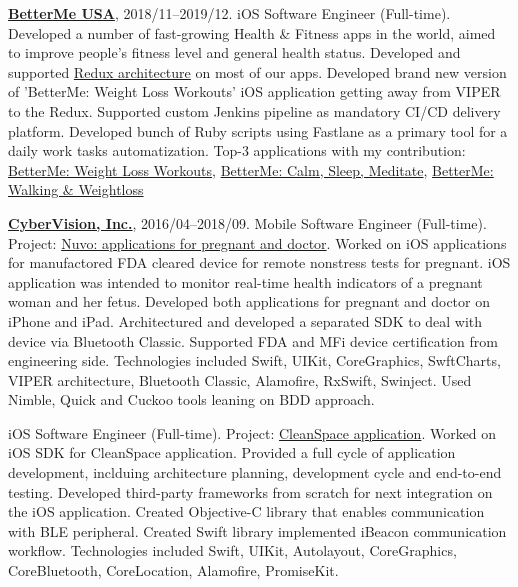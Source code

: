 \documentclass{article}
\begin{document}
\vspace*{8px}

\noindent \textbf{\href{https://betterme.world/about}{BetterMe USA}}, 2018/11--2019/12. 
iOS Software Engineer (Full-time).\newline
Developed a number of fast-growing Health \& Fitness apps in the world, 
aimed to improve people’s fitness level and general health status. Developed and supported 
\href{https://www.raywenderlich.com/books/advanced-ios-app-architecture/v3.0/chapters/6-architecture-redux}{Redux architecture} 
on most of our apps. Developed brand new version of 'BetterMe: Weight Loss Workouts' iOS application 
getting away from VIPER to the Redux. Supported custom Jenkins pipeline as mandatory CI/CD delivery platform. 
Developed bunch of Ruby scripts using Fastlane as a primary tool for a daily work tasks automatization.
Top-3 applications with my contribution: 
\href{https://apps.apple.com/us/app/betterme-weight-loss-workouts/id1264546236}{BetterMe: Weight Loss Workouts}, 
\href{https://apps.apple.com/us/app/betterme-calm-sleep-meditate/id1363010081}{BetterMe: Calm, Sleep, Meditate}, 
\href{https://apps.apple.com/us/app/betterme-walking-weightloss/id1434400695}{BetterMe: Walking \& Weightloss}

\vspace*{8px}

\noindent \textbf{\href{https://www.cybervisiontech.com}{CyberVision, Inc.}}, 2016/04–2018/09.
\newline Mobile Software Engineer (Full-time). Project: \href{https://www.nuvocares.com/solutions}{Nuvo: applications for pregnant and doctor}.
\newline Worked on iOS applications for manufactored FDA cleared device for remote nonstress tests for pregnant. 
iOS application was intended to monitor real-time health indicators of a pregnant woman and her fetus. 
Developed both applications for pregnant and doctor on iPhone and iPad.
Architectured and developed a separated SDK to deal with device via Bluetooth Classic.
Supported FDA and MFi device certification from engineering side.
\newline Technologies included Swift, UIKit, CoreGraphics, SwftCharts, VIPER architecture, 
Bluetooth Classic, Alamofire, RxSwift, Swinject. Used Nimble, Quick and Cuckoo tools leaning on BDD approach.

\noindent \newline iOS Software Engineer (Full-time). Project: \href{https://www.sensynehealth.com/cleanspace}{CleanSpace application}.
\newline Worked on iOS SDK for CleanSpace application. 
Provided a full cycle of application development, inclduing architecture planning, 
development cycle and end-to-end testing.
Developed third-party frameworks from scratch for next integration on the iOS application.
Created Objective-C library that enables communication with BLE peripheral.
Created Swift library implemented iBeacon communication workflow. 
\newline Technologies included Swift, UIKit, Autolayout, CoreGraphics, CoreBluetooth, CoreLocation, Alamofire, PromiseKit.
\end{document}
